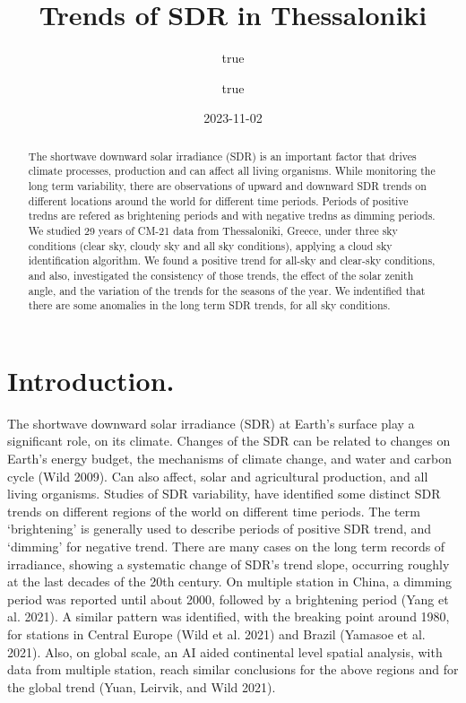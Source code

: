 \documentclass[
  preprint, 3p, authoryear]{article}
\title{Trends of SDR in Thessaloniki}
\author{true \and true}
\date{2023-11-02}
\begin{document}
\maketitle
\begin{abstract}
The shortwave downward solar irradiance (SDR) is an important factor that drives climate processes, production and can affect all living organisms.
While monitoring the long term variability, there are observations of upward and downward SDR trends on different locations around the world for different time periods.
Periods of positive tredns are refered as brightening periods and with negative tredns as dimming periods.
We studied 29 years of CM-21 data from Thessaloniki, Greece, under three sky conditions (clear sky, cloudy sky and all sky conditions), applying a cloud sky identification algorithm.
We found a positive trend for all-sky and clear-sky conditions, and also, investigated the consistency of those trends, the effect of the solar zenith angle, and the variation of the trends for the seasons of the year.
We indentified that there are some anomalies in the long term SDR trends, for all sky conditions.
\end{abstract}

\hypertarget{introduction.}{%
\section{Introduction.}\label{introduction.}}

The shortwave downward solar irradiance (SDR) at Earth's surface play a significant role, on its climate.
Changes of the SDR can be related to changes on Earth's energy budget, the mechanisms of climate change, and water and carbon cycle (Wild 2009).
Can also affect, solar and agricultural production, and all living organisms.
Studies of SDR variability, have identified some distinct SDR trends on different regions of the world on different time periods.
The term `brightening' is generally used to describe periods of positive SDR trend, and `dimming' for negative trend.
There are many cases on the long term records of irradiance, showing a systematic change of SDR's trend slope, occurring roughly at the last decades of the 20th century.
On multiple station in China, a dimming period was reported until about 2000, followed by a brightening period (Yang et al. 2021).
A similar pattern was identified, with the breaking point around 1980, for stations in Central Europe (Wild et al. 2021) and Brazil (Yamasoe et al. 2021).
Also, on global scale, an AI aided continental level spatial analysis, with data from multiple station, reach similar conclusions for the above regions and for the global trend (Yuan, Leirvik, and Wild 2021).
\end{document}
